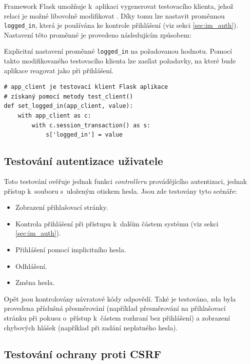 Framework Flask umožňuje k~aplikaci vygenerovat testovacího klienta, jehož relaci je možné libovolně modifikovat \cite{flask_testing}. Díky tomu lze nastavit proměnnou \texttt{logged\_in}, která je používána ke kontrole přihlášení (viz sekci \ref{sec:im_auth}). Nastavení této proměnné je provedeno následujícím způsobem:

\begin{listing}[htbp]
\caption{\label{lst:logged_in} Explicitní nastavení proměnné \texttt{logged\_in} na požadovanou hodnotu. Pomocí takto modifikovaného testovacího klienta lze zasílat požadavky, na které bude aplikace reagovat jako při přihlášení.}
\begin{verbatim}
# app_client je testovací klient Flask aplikace
# získaný pomocí metody test_client()
def set_logged_in(app_client, value):
    with app_client as c:
        with c.session_transaction() as s:
            s['logged_in'] = value
\end{verbatim}
\end{listing}

\subsection{Testování autentizace uživatele}

Toto testování ověřuje jednak funkci \textit{controlleru} provádějícího autentizaci, jednak přístup k~souboru s~uloženým otiskem hesla. Jsou zde testovány tyto scénáře:

\begin{itemize}
    \item Zobrazení přihlašovací stránky.
    \item Kontrola přihlášení při přístupu k~dalším částem systému (viz sekci \ref{sec:im_auth}).
    \item Přihlášení pomocí implicitního hesla.
    \item Odhlášení.
    \item Změna hesla.
\end{itemize}

Opět jsou kontrolovány návratové kódy odpovědí. Také je testováno, zda byla provedena příslušná přesměrování (například přesměrování na přihlašovací stránku při pokusu o~přístup k~částem rozhraní bez přihlášení) a zobrazení chybových hlášek (například při zadání neplatného hesla).

\subsection{Testování ochrany proti CSRF}
\label{sec:te_csrf}

